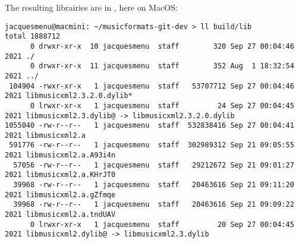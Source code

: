 The resulting librairies are in , here on MacOS:
\begin{lstlisting}[language=Terminal]
jacquesmenu@macmini: ~/musicformats-git-dev > ll build/lib
total 1888712
      0 drwxr-xr-x  10 jacquesmenu  staff        320 Sep 27 00:04:46 2021 ./
      0 drwxr-xr-x  11 jacquesmenu  staff        352 Aug  1 18:32:54 2021 ../
 104904 -rwxr-xr-x   1 jacquesmenu  staff   53707712 Sep 27 00:04:46 2021 libmusicxml2.3.2.0.dylib*
      0 lrwxr-xr-x   1 jacquesmenu  staff         24 Sep 27 00:04:45 2021 libmusicxml2.3.dylib@ -> libmusicxml2.3.2.0.dylib
1055040 -rw-r--r--   1 jacquesmenu  staff  532838416 Sep 27 00:04:41 2021 libmusicxml2.a
 591776 -rw-r--r--   1 jacquesmenu  staff  302989312 Sep 21 09:05:55 2021 libmusicxml2.a.A93i4n
  57056 -rw-r--r--   1 jacquesmenu  staff   29212672 Sep 21 09:01:27 2021 libmusicxml2.a.KHrJT0
  39968 -rw-r--r--   1 jacquesmenu  staff   20463616 Sep 21 09:11:20 2021 libmusicxml2.a.gZfmqe
  39968 -rw-r--r--   1 jacquesmenu  staff   20463616 Sep 21 09:09:22 2021 libmusicxml2.a.tndUAV
      0 lrwxr-xr-x   1 jacquesmenu  staff         20 Sep 27 00:04:45 2021 libmusicxml2.dylib@ -> libmusicxml2.3.dylib
\end{lstlisting}

